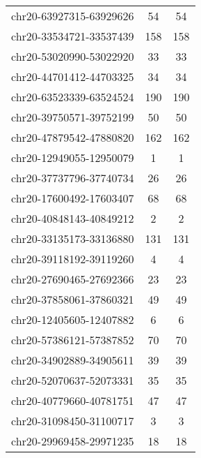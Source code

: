 \begin{longtable}{lSS}
	chr20-63927315-63929626 & 54     & 54                                        \\
	chr20-33534721-33537439 & 158    & 158                                       \\
	chr20-53020990-53022920 & 33     & 33                                        \\
	chr20-44701412-44703325 & 34     & 34                                        \\
	chr20-63523339-63524524 & 190    & 190                                       \\
	chr20-39750571-39752199 & 50     & 50                                        \\
	chr20-47879542-47880820 & 162    & 162                                       \\
	chr20-12949055-12950079 & 1      & 1                                         \\
	chr20-37737796-37740734 & 26     & 26                                        \\
	chr20-17600492-17603407 & 68     & 68                                        \\
	chr20-40848143-40849212 & 2      & 2                                         \\
	chr20-33135173-33136880 & 131    & 131                                       \\
	chr20-39118192-39119260 & 4      & 4                                         \\
	chr20-27690465-27692366 & 23     & 23                                        \\
	chr20-37858061-37860321 & 49     & 49                                        \\
	chr20-12405605-12407882 & 6      & 6                                         \\
	chr20-57386121-57387852 & 70     & 70                                        \\
	chr20-34902889-34905611 & 39     & 39                                        \\
	chr20-52070637-52073331 & 35     & 35                                        \\
	chr20-40779660-40781751 & 47     & 47                                        \\
	chr20-31098450-31100717 & 3      & 3                                         \\
	chr20-29969458-29971235 & 18     & 18                                        \\

\end{longtable}
